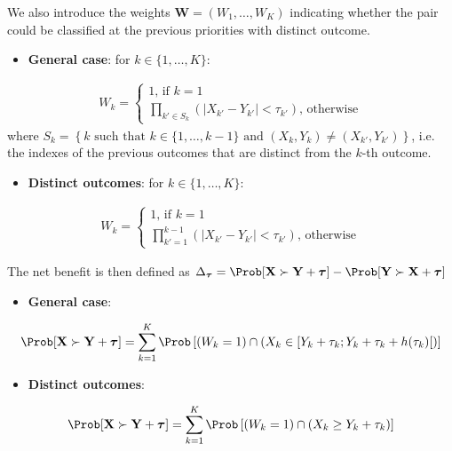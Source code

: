 \documentclass[12pt]{article}
\newcommand\VX{\mathbf{X}}
\newcommand\VY{\mathbf{Y}}
\newcommand\VW{\mathbf{W}}
\newcommand\Vtau{\boldsymbol{\tau}}
\begin{document}
\bigskip

We also introduce the weights \(\VW = (W_1,\ldots,W_K)\) indicating
whether the pair could be classified at the previous priorities with
distinct outcome.
\begin{itemize}
\item \textbf{General case}: for \(k \in \{1,\ldots,K\}\):
\end{itemize}
\begin{align*}
W_k = \left\{ \begin{array}{c} 
1\text{, if } k = 1 \\ 
\prod_{k' \in S_k } \left(\left|X_{k'} - Y_{k'}\right| < \tau_{k'}\right) \text{, otherwise} 
\end{array} \right.
\end{align*}
where \(S_k=\left\{k \text{ such that }  k \in \{1,\ldots,k-1\} \text{ and } \left(X_k,Y_k\right) \neq
\left(X_{k'},Y_{k'}\right)\right\}\), i.e. the indexes of the previous
outcomes that are distinct from the \(k\)-th outcome.

\begin{itemize}
\item \textbf{Distinct outcomes}: for \(k \in \{1,\ldots,K\}\):
\end{itemize}
\begin{align*}
W_k = \left\{ \begin{array}{c} 
1\text{, if } k = 1 \\ 
\prod_{k'=1}^{k-1} \left(\left|X_{k'} - Y_{k'}\right| < \tau_{k'}\right) \text{, otherwise} 
\end{array} \right.
\end{align*}

\clearpage

The net benefit is then defined as \(\Delta_{\Vtau} = \Prob[\VX \succ \VY + \Vtau] - \Prob[\VY \succ \VX + \Vtau]\)

\begin{itemize}
\item \textbf{General case}:
\end{itemize}
\begin{align*}
\Prob[\VX \succ \VY + \Vtau] = \sum_{k=1}^K \Prob\left[\left(W_k=1\right) \cap
\left(X_k \in [Y_k + \tau_k;Y_k + \tau_k + h(\tau_k)[ \right) \right] 
\end{align*}
\begin{itemize}
\item \textbf{Distinct outcomes}:
\end{itemize}
\begin{align*}
\Prob[\VX \succ \VY + \Vtau] = \sum_{k=1}^K
  \Prob\left[\left(W_k=1\right) \cap \left(X_k \geq Y_k + \tau_k\right) \right]
\end{align*}
\end{document}
